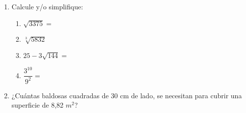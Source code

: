 \documentclass[fleqn]{article}
\begin{document}
\begin{enumerate}
\begin{enumerate}
\end{enumerate}
\item Calcule y/o simplifique:
\begin{enumerate}
\item $\sqrt{3375}=$ \noanswer
\item $\sqrt[3]{5832}$\noanswer
\item $25-3\sqrt{144}=$\noanswer
\item $\dfrac{3^{10}}{9^{2}}=$\noanswer
\end{enumerate}
\item ¿Cuántas baldosas cuadradas de 30 cm de lado, se necesitan para cubrir una superficie de 8,82 $m^{2}$?\noanswer[2in]
\end{enumerate}
\end{document}
